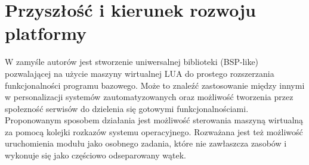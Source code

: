 \documentclass{article}
\begin{document}
\section{Przyszłość i kierunek rozwoju platformy}
W zamyśle autorów jest stworzenie uniwersalnej biblioteki (BSP-like) pozwalającej na użycie maszyny wirtualnej LUA do prostego rozszerzania 
funkcjonalności programu bazowego. Może to znaleźć zastosowanie między innymi w personalizacji systemów zautomatyzowanych oraz możliwość 
tworzenia przez społezność serwisów do dzielenia się gotowymi funkcjonalnościami.\\
Proponowanym sposobem działania jest możliwość sterowania maszyną wirtualną za pomocą kolejki rozkazów systemu operacyjnego. 
Rozważana jest też możliwość uruchomienia modułu jako osobnego zadania, które nie zawłaszcza zasobów i wykonuje się jako częściowo odseparowany wątek.
\end{document}
